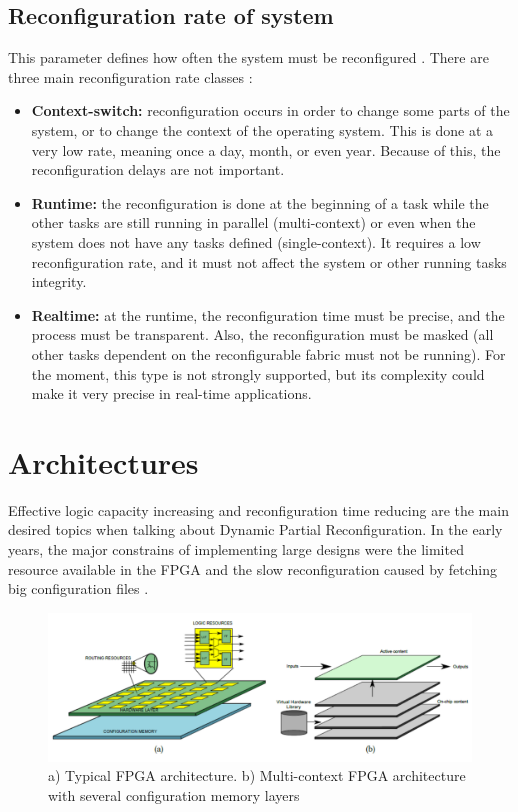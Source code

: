 \documentclass[twoside]{romjist}
\begin{document}
	\subsection{Reconfiguration rate of system}
	\hspace{0.5cm}
	This parameter defines how often the system must be reconfigured \cite{1}. There are three main
	reconfiguration rate classes \cite{7}:
	\begin{itemize}
		\item
		\textbf{Context-switch:} reconfiguration occurs in order to change some parts of the system, or
		to change the context of the operating system. This is done at a very low rate, meaning
		once a day, month, or even year. Because of this, the reconfiguration delays are not
		important.
		\item
		\textbf{Runtime:} the reconfiguration is done at the beginning of a task while the other tasks
		are still running in parallel (multi-context) or even when the system does not have any
		tasks defined (single-context). It requires a low reconfiguration rate, and it must not
		affect the system or other running tasks integrity.
		\item
		\textbf{Realtime:} at the runtime, the reconfiguration time must be precise, and the process must
		be transparent. Also, the reconfiguration must be masked (all other tasks dependent on
		the reconfigurable fabric must not be running). For the moment, this type is not strongly
		supported, but its complexity could make it very precise in real-time applications.
	\end{itemize}
	
	\section{Architectures}
	\hspace{0.5cm}
	Effective logic capacity increasing and reconfiguration time reducing are the main desired
	topics when talking about Dynamic Partial Reconfiguration. In the early years, the major
	constrains of implementing large designs were the limited resource available in the FPGA and
	the slow reconfiguration caused by fetching big configuration files \cite{2} \cite{9}.
	
	\begin{figure}[h]
		\centering
		\includegraphics[width=\textwidth]{fig_3_1}
		\caption{a) Typical FPGA architecture. b) Multi-context FPGA architecture with several
		configuration memory layers \cite{2}}
		\label{fig:figure31}
	\end{figure}
	
\end{document}
